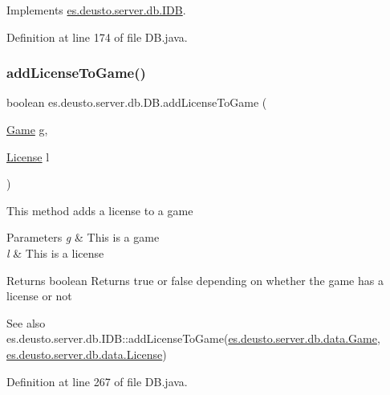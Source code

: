 Implements \hyperlink{interfacees_1_1deusto_1_1server_1_1db_1_1_i_d_b_a645335b2cbfa27c0199783ff2f33559e}{es.\+deusto.\+server.\+db.\+I\+DB}.



Definition at line 174 of file D\+B.\+java.

\mbox{\label{classes_1_1deusto_1_1server_1_1db_1_1_d_b_a5f4f68a9d2b7d6e8fbcc6e28136b92c8}} 
\subsubsection{\texorpdfstring{add\+License\+To\+Game()}{addLicenseToGame()}}
{\footnotesize\ttfamily boolean es.\+deusto.\+server.\+db.\+D\+B.\+add\+License\+To\+Game (\begin{DoxyParamCaption}\item[{\hyperlink{classes_1_1deusto_1_1server_1_1db_1_1data_1_1_game}{Game}}]{g,  }\item[{\hyperlink{classes_1_1deusto_1_1server_1_1db_1_1data_1_1_license}{License}}]{l }\end{DoxyParamCaption})}

This method adds a license to a game 
\begin{DoxyParams}{Parameters}
{\em g} & This is a game \\
\hline
{\em l} & This is a license \\
\hline
\end{DoxyParams}
\begin{DoxyReturn}{Returns}
boolean Returns true or false depending on whether the game has a license or not 
\end{DoxyReturn}
\begin{DoxySeeAlso}{See also}
es.\+deusto.\+server.\+db.\+I\+D\+B\+::add\+License\+To\+Game(\hyperlink{classes_1_1deusto_1_1server_1_1db_1_1data_1_1_game}{es.\+deusto.\+server.\+db.\+data.\+Game}, \hyperlink{classes_1_1deusto_1_1server_1_1db_1_1data_1_1_license}{es.\+deusto.\+server.\+db.\+data.\+License}) 
\end{DoxySeeAlso}


Definition at line 267 of file D\+B.\+java.

\mbox{\label{classes_1_1deusto_1_1server_1_1db_1_1_d_b_a996d40d6b184ea0dfa3dcab05bc04757}} 
